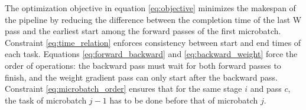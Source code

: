 \documentclass{article}
\begin{document}


The optimization objective in equation \ref{eq:objective} minimizes the makespan of the pipeline by reducing the difference between the completion time of the last W pass and the earliest start among the forward passes of the first microbatch. Constraint \ref{eq:time_relation} enforces consistency between start and end times of each task. Equations \ref{eq:forward_backward} and \ref{eq:backward_weight} force the order of operations: the backward pass must wait for both forward passes to finish, and the weight gradient pass can only start after the backward pass. Constraint \ref{eq:microbatch_order} ensures that for the same stage $i$ and pass $c$, the task of microbatch $j-1$ has to be done before that of microbatch $j$.
\end{document}
